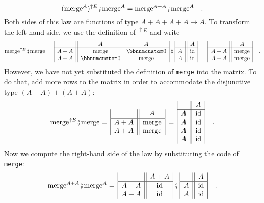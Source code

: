 ~\vspace{-0.3\baselineskip}
\[
(\text{merge}^{A})^{\uparrow E}\bef\text{merge}^{A}=\text{merge}^{A+A}\bef\text{merge}^{A}\quad.
\]
Both sides of this law are functions of type $A+A+A+A\rightarrow A$.
To transform the left-hand side, we use the definition of $^{\uparrow E}$
and write
\[
\text{merge}^{\uparrow E}\bef\text{merge}=\,\begin{array}{|c||cc|}
 & A & A\\
\hline A+A & \text{merge} & \bbnum 0\\
A+A & \bbnum 0 & \text{merge}
\end{array}\,\bef\,\begin{array}{|c||c|}
 & A\\
\hline A & \text{id}\\
A & \text{id}
\end{array}\,=\,\begin{array}{|c||c|}
 & A\\
\hline A+A & \text{merge}\\
A+A & \text{merge}
\end{array}\quad.
\]
However, we have not yet substituted the definition of \lstinline!merge!
into the matrix. To do that, add more rows to the matrix in order
to accommodate the disjunctive type $(A+A)+(A+A)$:
\[
\text{merge}^{\uparrow E}\bef\text{merge}=\,\begin{array}{|c||c|}
 & A\\
\hline A+A & \text{merge}\\
A+A & \text{merge}
\end{array}\,=\,\begin{array}{|c||c|}
 & A\\
\hline A & \text{id}\\
A & \text{id}\\
A & \text{id}\\
A & \text{id}
\end{array}\quad.
\]
Now we compute the right-hand side of the law by substituting the
code of \lstinline!merge!:
\[
\text{merge}^{A+A}\bef\text{merge}^{A}=\,\begin{array}{|c||c|}
 & A+A\\
\hline A+A & \text{id}\\
A+A & \text{id}
\end{array}\,\bef\,\begin{array}{|c||c|}
 & A\\
\hline A & \text{id}\\
A & \text{id}
\end{array}\quad.
\]
